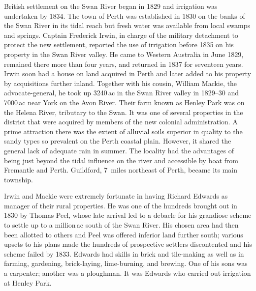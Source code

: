 British settlement on the Swan River began in 1829 and irrigation was
undertaken by 1834.  The town of Perth was established in 1830 on the
banks of the Swan River in its tidal reach but fresh water was
available from local swamps and springs.  Captain Frederick Irwin, in
charge of the military detachment to protect the new settlement,
reported the use of irrigation before 1835 on his property in the Swan
River valley.  He came to Western Australia in June 1829, remained
there more than four years, and returned in 1837 for seventeen
years.
Irwin soon had a house on land acquired in Perth and later added to
his property by acquisitions further inland.  Together with his
cousin, William Mackie, the advocate-general, he took up 3240\,ac in
the Swan River valley in 1829--30 and 7000\,ac near York on the Avon
River.  Their farm known as Henley Park was on the Helena River,
tributary to the Swan.  It was one of several properties in the
district that were acquired by members of the new colonial
administration.  A prime attraction there was the extent of alluvial
soils superior in quality to the sandy types so prevalent on the Perth
coastal plain.  However, it shared the general lack of adequate rain
in summer.  The locality had the advantages of being just beyond the
tidal influence on the river and accessible by boat from Fremantle and
Perth.  Guildford, 7~miles northeast of Perth, became its main
township.

Irwin and Mackie were extremely fortunate in having Richard Edwards as
manager of their rural properties.  He was one of the hundreds brought
out in 1830 by Thomas Peel, whose late arrival led to a debacle for
his grandiose scheme to settle up to a million\,ac south of the Swan
River.  His chosen area had then been allotted to others and Peel was
offered inferior land further south; various upsets to his plans made
the hundreds of prospective settlers discontented and his scheme
failed by 1833.  Edwards had skills in brick and tile-making as well
as in farming, gardening, brick-laying, lime-burning, and brewing.
One of his sons was a carpenter; another was a ploughman.  It was
Edwards who carried out irrigation at Henley Park.

